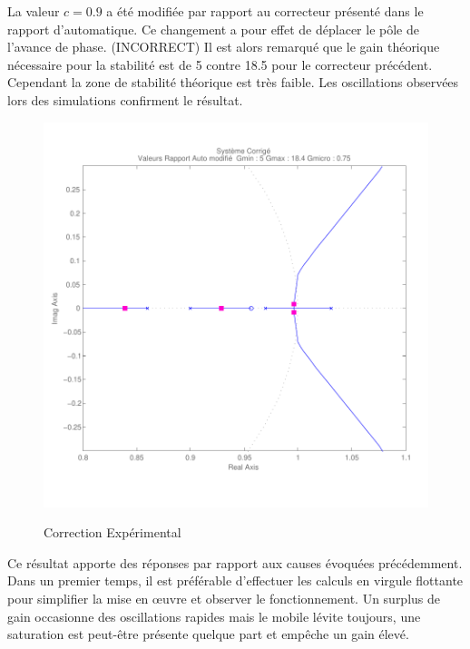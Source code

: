 \documentclass[11pt, french]{article} %
\begin{document}
La valeur $c=0.9$ a été modifiée par rapport au correcteur présenté dans le rapport d'automatique. Ce changement a pour effet de déplacer le pôle de l'avance de phase. (INCORRECT) Il est alors remarqué que le gain théorique nécessaire pour la stabilité est de 5 contre 18.5 pour le correcteur précédent. Cependant la zone de stabilité théorique est très faible. Les oscillations observées lors des simulations confirment le résultat.

\begin{figure}[h!]
	\centering
	\includegraphics[width = 13cm,trim=0 1.4cm 0 0.7cm ,clip=true]
					{SolutionNumerique/SystemeCorrigeSolex.pdf}
	\label{CorrExpe}	
	\caption{Correction Expérimental}
\end{figure}

Ce résultat apporte des réponses par rapport aux causes évoquées précédemment. Dans un premier temps, il est préférable d'effectuer les calculs en virgule flottante pour simplifier la mise en œuvre et observer le fonctionnement. Un surplus de gain occasionne des oscillations rapides mais le mobile lévite toujours, une saturation est peut-être présente quelque part et empêche un gain élevé.
\end{document}
